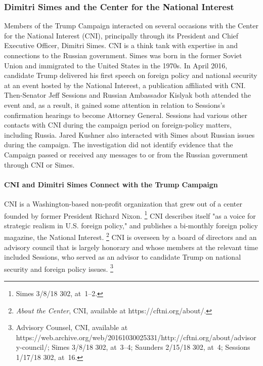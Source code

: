\subsubsection{Dimitri Simes and the Center for the National Interest}

Members of the Trump Campaign interacted on several occasions with the Center for the National Interest (CNI), principally through its President and Chief Executive Officer, Dimitri Simes.
CNI is a think tank with expertise in and connections to the Russian government.
Simes was born in the former Soviet Union and immigrated to the United States in the 1970s.
In April 2016, candidate Trump delivered his first speech on foreign policy and national security at an event hosted by the National Interest, a publication affiliated with CNI\null.
Then-Senator Jeff Sessions and Russian Ambassador Kislyak both attended the event and, as a result, it gained some attention in relation to Sessions's confirmation hearings to become Attorney General.
Sessions had various other contacts with CNI during the campaign period on foreign-policy matters, including Russia.
Jared Kushner also interacted with Simes about Russian issues during the campaign.
The investigation did not identify evidence that the Campaign passed or received any messages to or from the Russian government through CNI or Simes.

\paragraph{CNI and Dimitri Simes Connect with the Trump Campaign}

CNI is a Washington-based non-profit organization that grew out of a center founded by former President Richard Nixon.%
\footnote{Simes 3/8/18 302, at~1--2.}
CNI describes itself "as a voice for strategic realism in U.S. foreign policy," and publishes a bi-monthly foreign policy magazine, the National Interest.%
\footnote{\textit{About the Center}, CNI, available at https://cftni.org/about/.}
CNI is overseen by a board of directors and an advisory council that is largely honorary and whose members at the relevant time included Sessions, who served as an advisor to candidate Trump on national security and foreign policy issues.%
\footnote{Advisory Counsel, CNI, available at
https://web.archive.org/web/20161030025331/http://cftni.org/about/advisory-council/;
Simes 3/8/18 302, at~3--4;
Saunders 2/15/18 302, at~4;
Sessions 1/17/18 302, at~16.}

